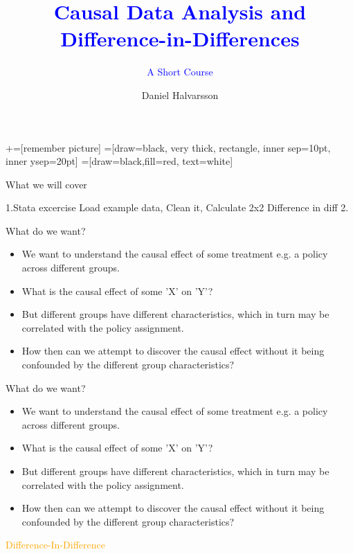 \documentclass[notes,11pt, aspectratio=169]{beamer}
\title[]{\textcolor{blue}{Causal Data Analysis and Difference-in-Differences}}
\subtitle[]{\textcolor{blue}{A Short Course}}
\author[DH]{Daniel Halvarsson}
\institute{The Ratio Institute, Stockholm\\
\vspace{0.2cm}
 \href{daniel.halvarsson@ratio.se}{daniel.halvarsson@ratio.se}}
\date{}
\begin{document}
\newcommand\marktopleft[1]{%
    \tikz[overlay,remember picture] 
        \node (marker-#1-a) at (-.3em,.3em) {};%
}
\newcommand\markbottomright[2]{%
    \tikz[overlay,remember picture] 
        \node (marker-#1-b) at (0em,0em) {};%
}
+=[remember picture] 
 =[draw=black, very thick, rectangle, inner sep=10pt, inner ysep=20pt]
 =[draw=black,fill=red, text=white]

\begin{frame}
\maketitle
\end{frame}

\begin{frame}{What we will cover}

1.Stata excercise Load example data, Clean it, Calculate 2x2 Difference in diff 
2. 
\end{frame}

\begin{frame}{What do we want?}
    \begin{itemize}
        \item We want to understand the causal effect of some treatment e.g. a policy across different groups.
        \item What is the causal effect of some 'X' on 'Y'?
        \item But different groups have different characteristics, which in turn may be correlated with the policy assignment.
        \item How then can we attempt to discover the causal effect without it being confounded by the different group characteristics?
    \end{itemize}
\end{frame}

\begin{frame}{What do we want?}
    \begin{itemize}
        \item We want to understand the causal effect of some treatment e.g. a policy across different groups.
        \item What is the causal effect of some 'X' on 'Y'?
        \item But different groups have different characteristics, which in turn may be correlated with the policy assignment.
        \item How then can we attempt to discover the causal effect without it being confounded by the different group characteristics?
    \end{itemize}
    \flushright
    \vspace{1cm}
    \textcolor{orange}{\huge{Difference-In-Difference}}
\end{frame}
\end{document}
